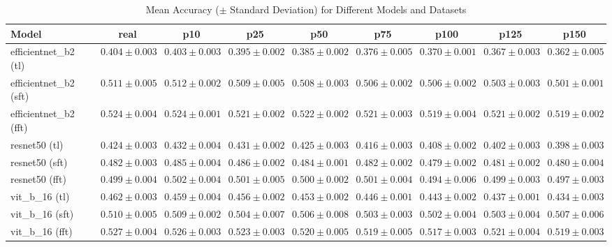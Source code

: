 \begin{table}[htbp]
    \centering
    \footnotesize %
    \caption{Mean Accuracy ($\pm$ Standard Deviation) for Different Models and Datasets}
    \label{tab:accuracy_results}
    \begin{tabular}{l *{8}{c}}
        \toprule
        \textbf{Model} & \textbf{real} & \textbf{p10} & \textbf{p25} & \textbf{p50} & \textbf{p75} & \textbf{p100} & \textbf{p125} & \textbf{p150} \\
        \midrule
        efficientnet\_b2 (tl) & $0.404 \pm 0.003$ & $0.403 \pm 0.003$ & $0.395 \pm 0.002$ & $0.385 \pm 0.002$ & $0.376 \pm 0.005$ & $0.370 \pm 0.001$ & $0.367 \pm 0.003$ & $0.362 \pm 0.005$ \\
        efficientnet\_b2 (sft) & $0.511 \pm 0.005$ & $0.512 \pm 0.002$ & $0.509 \pm 0.005$ & $0.508 \pm 0.003$ & $0.506 \pm 0.002$ & $0.506 \pm 0.002$ & $0.503 \pm 0.003$ & $0.501 \pm 0.001$ \\
        efficientnet\_b2 (fft) & $0.524 \pm 0.004$ & $0.524 \pm 0.001$ & $0.521 \pm 0.002$ & $0.522 \pm 0.002$ & $0.521 \pm 0.003$ & $0.519 \pm 0.004$ & $0.521 \pm 0.002$ & $0.519 \pm 0.002$ \\
        resnet50 (tl) & $0.424 \pm 0.003$ & $0.432 \pm 0.004$ & $0.431 \pm 0.002$ & $0.425 \pm 0.003$ & $0.416 \pm 0.003$ & $0.408 \pm 0.002$ & $0.402 \pm 0.003$ & $0.398 \pm 0.003$ \\
        resnet50 (sft) & $0.482 \pm 0.003$ & $0.485 \pm 0.004$ & $0.486 \pm 0.002$ & $0.484 \pm 0.001$ & $0.482 \pm 0.002$ & $0.479 \pm 0.002$ & $0.481 \pm 0.002$ & $0.480 \pm 0.004$ \\
        resnet50 (fft) & $0.499 \pm 0.004$ & $0.502 \pm 0.004$ & $0.501 \pm 0.005$ & $0.500 \pm 0.002$ & $0.501 \pm 0.004$ & $0.494 \pm 0.006$ & $0.499 \pm 0.003$ & $0.497 \pm 0.003$ \\
        vit\_b\_16 (tl) & $0.462 \pm 0.003$ & $0.459 \pm 0.004$ & $0.456 \pm 0.002$ & $0.453 \pm 0.002$ & $0.446 \pm 0.001$ & $0.443 \pm 0.002$ & $0.437 \pm 0.001$ & $0.434 \pm 0.003$ \\
        vit\_b\_16 (sft) & $0.510 \pm 0.005$ & $0.509 \pm 0.002$ & $0.504 \pm 0.007$ & $0.506 \pm 0.008$ & $0.503 \pm 0.003$ & $0.502 \pm 0.004$ & $0.503 \pm 0.004$ & $0.507 \pm 0.006$ \\
        vit\_b\_16 (fft) & $0.527 \pm 0.004$ & $0.526 \pm 0.003$ & $0.523 \pm 0.003$ & $0.520 \pm 0.005$ & $0.519 \pm 0.005$ & $0.517 \pm 0.003$ & $0.521 \pm 0.004$ & $0.519 \pm 0.003$ \\
        \bottomrule
    \end{tabular}
\end{table}


